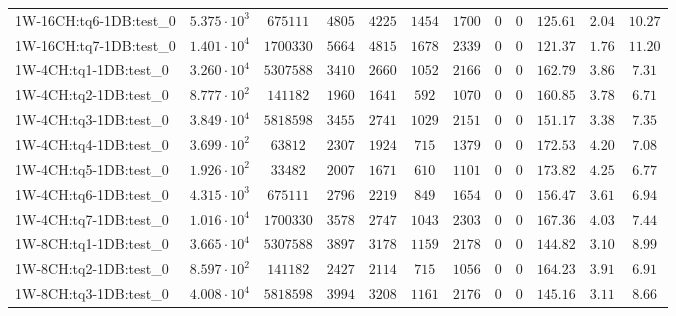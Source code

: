 \begin{tabular}{|l|c|c|c|c|c|c|c|c|c|c|c|}
1W-16CH:tq6-1DB:test\_0  & $ 5.375 \cdot 10^{3} $ & $ 675111    $ & $ 4805    $ & $ 4225   $ & $ 1454   $ & $ 1700   $ & $ 0 $ & $ 0 $ & $ 125.61      $ & $ 2.04    $ & $ 10.27   $ \\
1W-16CH:tq7-1DB:test\_0  & $ 1.401 \cdot 10^{4} $ & $ 1700330   $ & $ 5664    $ & $ 4815   $ & $ 1678   $ & $ 2339   $ & $ 0 $ & $ 0 $ & $ 121.37      $ & $ 1.76    $ & $ 11.20   $ \\
1W-4CH:tq1-1DB:test\_0   & $ 3.260 \cdot 10^{4} $ & $ 5307588   $ & $ 3410    $ & $ 2660   $ & $ 1052   $ & $ 2166   $ & $ 0 $ & $ 0 $ & $ 162.79      $ & $ 3.86    $ & $ 7.31    $ \\
1W-4CH:tq2-1DB:test\_0   & $ 8.777 \cdot 10^{2} $ & $ 141182    $ & $ 1960    $ & $ 1641   $ & $ 592    $ & $ 1070   $ & $ 0 $ & $ 0 $ & $ 160.85      $ & $ 3.78    $ & $ 6.71    $ \\
1W-4CH:tq3-1DB:test\_0   & $ 3.849 \cdot 10^{4} $ & $ 5818598   $ & $ 3455    $ & $ 2741   $ & $ 1029   $ & $ 2151   $ & $ 0 $ & $ 0 $ & $ 151.17      $ & $ 3.38    $ & $ 7.35    $ \\
1W-4CH:tq4-1DB:test\_0   & $ 3.699 \cdot 10^{2} $ & $ 63812     $ & $ 2307    $ & $ 1924   $ & $ 715    $ & $ 1379   $ & $ 0 $ & $ 0 $ & $ 172.53      $ & $ 4.20    $ & $ 7.08    $ \\
1W-4CH:tq5-1DB:test\_0   & $ 1.926 \cdot 10^{2} $ & $ 33482     $ & $ 2007    $ & $ 1671   $ & $ 610    $ & $ 1101   $ & $ 0 $ & $ 0 $ & $ 173.82      $ & $ 4.25    $ & $ 6.77    $ \\
1W-4CH:tq6-1DB:test\_0   & $ 4.315 \cdot 10^{3} $ & $ 675111    $ & $ 2796    $ & $ 2219   $ & $ 849    $ & $ 1654   $ & $ 0 $ & $ 0 $ & $ 156.47      $ & $ 3.61    $ & $ 6.94    $ \\
1W-4CH:tq7-1DB:test\_0   & $ 1.016 \cdot 10^{4} $ & $ 1700330   $ & $ 3578    $ & $ 2747   $ & $ 1043   $ & $ 2303   $ & $ 0 $ & $ 0 $ & $ 167.36      $ & $ 4.03    $ & $ 7.44    $ \\
1W-8CH:tq1-1DB:test\_0   & $ 3.665 \cdot 10^{4} $ & $ 5307588   $ & $ 3897    $ & $ 3178   $ & $ 1159   $ & $ 2178   $ & $ 0 $ & $ 0 $ & $ 144.82      $ & $ 3.10    $ & $ 8.99    $ \\
1W-8CH:tq2-1DB:test\_0   & $ 8.597 \cdot 10^{2} $ & $ 141182    $ & $ 2427    $ & $ 2114   $ & $ 715    $ & $ 1056   $ & $ 0 $ & $ 0 $ & $ 164.23      $ & $ 3.91    $ & $ 6.91    $ \\
1W-8CH:tq3-1DB:test\_0   & $ 4.008 \cdot 10^{4} $ & $ 5818598   $ & $ 3994    $ & $ 3208   $ & $ 1161   $ & $ 2176   $ & $ 0 $ & $ 0 $ & $ 145.16      $ & $ 3.11    $ & $ 8.66    $ \\

\end{tabular}
